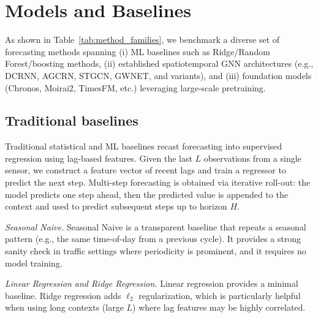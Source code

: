 \documentclass[10pt]{article}
\begin{document}


\section{Models and Baselines}
\label{sec:models}

\providecommand{\freq}{15\text{ min}}
\providecommand{\ctxset}{\{48, 98, 196, 336, 720\}}
\providecommand{\hzset}{\{3, 6, 12, 48\}}

As shown in Table~\ref{tab:method_families}, we benchmark a diverse set of forecasting methods spanning (i) ML baselines such as Ridge/Random Forest/boosting methods, (ii) established spatiotemporal GNN architectures (e.g., DCRNN, AGCRN, STGCN, GWNET, and variants), and (iii) foundation models (Chronos, Moirai2, TimesFM, etc.) leveraging large-scale pretraining.





\subsection{Traditional baselines}
Traditional statistical and ML baselines recast forecasting into supervised regression using lag-based features.
Given the last $L$ observations from a single sensor, we construct a feature vector of recent lags and train a
regressor to predict the next step. Multi-step forecasting is obtained via iterative roll-out: the model predicts
one step ahead, then the predicted value is appended to the context and used to predict subsequent steps up
to horizon $H$.

\textit{Seasonal Naive.}
Seasonal Naive is a transparent baseline that repeats a seasonal pattern (e.g., the same time-of-day
from a previous cycle). It provides a strong sanity check in traffic settings where periodicity is prominent,
and it requires no model training.

\textit{Linear Regression and Ridge Regression.}
Linear regression provides a minimal baseline. Ridge regression adds $\ell_2$ regularization, which is
particularly helpful when using long contexts (large $L$) where lag features may be highly correlated.
\end{document}
